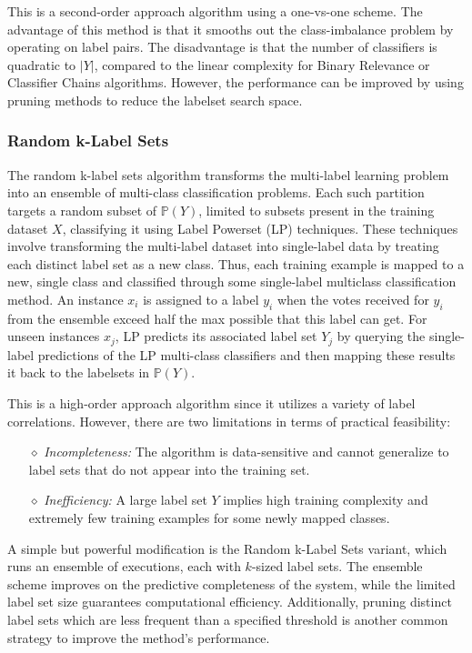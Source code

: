 \documentclass[12pt]{report}
\begin{document}
	This is a second-order approach algorithm using a one-vs-one scheme. The
  advantage of this method is that it smooths out the class-imbalance problem
   by operating on label pairs. The disadvantage is that the number of
  classifiers is quadratic to $|Y|$, compared to the linear complexity for Binary Relevance or
  Classifier Chains algorithms. However, the performance can be improved by
  using pruning methods to reduce the labelset search space.
	
	\subsubsection*{Random k-Label Sets}
	The random k-label sets algorithm transforms the multi-label learning problem
  into an ensemble of multi-class classification problems. Each such partition
  targets a random subset of $\mathbb{P}(Y)$, limited to subsets present in the
  training dataset $X$, classifying it using Label Powerset (LP) techniques.
  These techniques involve transforming the multi-label dataset into
  single-label data by treating each distinct label set as a new class. Thus, each training example
  is mapped to a new, single class and classified through some single-label multiclass
  classification method. An instance $x_i$ is assigned to a label $y_i$ when the
  votes received for $y_i$ from the ensemble exceed half the max possible that
  this label can get.
  For unseen instances $x_j$, LP predicts its associated label set $Y_j$ by
  querying the single-label predictions of the LP multi-class classifiers and then mapping these
  results it back to the labelsets in $\mathbb{P}(Y)$.
	
	This is a high-order approach algorithm since it utilizes a variety of label correlations. However, there are two limitations in terms of practical feasibility: 
	\begin{itemize}
		\item[$\diamond$] \emph{Incompleteness: }The algorithm is data-sensitive and cannot generalize to label sets that do not appear into the training set.
		\item[$\diamond$] \emph{Inefficiency: }A large label set $Y$ implies high training complexity and extremely few training examples for some newly mapped classes.
	\end{itemize}

	A simple but powerful modification is the Random k-Label Sets variant, which
  runs an ensemble of executions, each with $k$-sized label sets. The ensemble
  scheme improves on the predictive completeness of the system, while the
  limited label set size guarantees computational efficiency. Additionally,
  pruning distinct label sets which are less frequent than a specified threshold is
  another common strategy to improve the method's performance.
	
\end{document}
